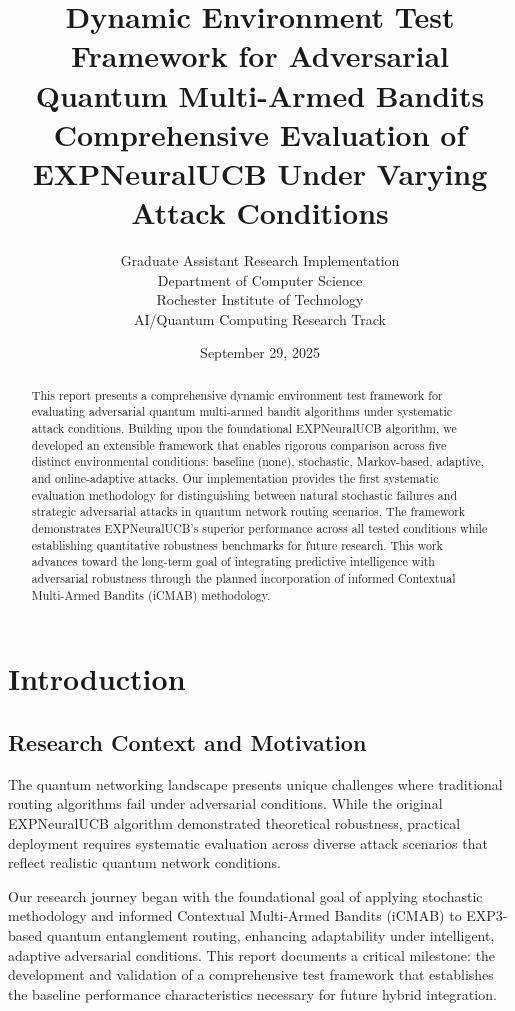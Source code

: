 \documentclass[11pt,a4paper]{article}
\title{\textbf{Dynamic Environment Test Framework for Adversarial Quantum Multi-Armed Bandits}\\ 
\large{Comprehensive Evaluation of EXPNeuralUCB Under Varying Attack Conditions}}
\author{Graduate Assistant Research Implementation \\ 
Department of Computer Science \\ 
Rochester Institute of Technology \\ 
AI/Quantum Computing Research Track}
\date{September 29, 2025}
\begin{document}
\maketitle

\begin{abstract}
This report presents a comprehensive dynamic environment test framework for evaluating adversarial quantum multi-armed bandit algorithms under systematic attack conditions. Building upon the foundational EXPNeuralUCB algorithm, we developed an extensible framework that enables rigorous comparison across five distinct environmental conditions: baseline (none), stochastic, Markov-based, adaptive, and online-adaptive attacks. Our implementation provides the first systematic evaluation methodology for distinguishing between natural stochastic failures and strategic adversarial attacks in quantum network routing scenarios. The framework demonstrates EXPNeuralUCB's superior performance across all tested conditions while establishing quantitative robustness benchmarks for future research. This work advances toward the long-term goal of integrating predictive intelligence with adversarial robustness through the planned incorporation of informed Contextual Multi-Armed Bandits (iCMAB) methodology.
\end{abstract}

\tableofcontents
\newpage

\section{Introduction}

\subsection{Research Context and Motivation}

The quantum networking landscape presents unique challenges where traditional routing algorithms fail under adversarial conditions. While the original EXPNeuralUCB algorithm demonstrated theoretical robustness, practical deployment requires systematic evaluation across diverse attack scenarios that reflect realistic quantum network conditions.

Our research journey began with the foundational goal of applying stochastic methodology and informed Contextual Multi-Armed Bandits (iCMAB) to EXP3-based quantum entanglement routing, enhancing adaptability under intelligent, adaptive adversarial conditions. This report documents a critical milestone: the development and validation of a comprehensive test framework that establishes the baseline performance characteristics necessary for future hybrid integration.
\end{document}
